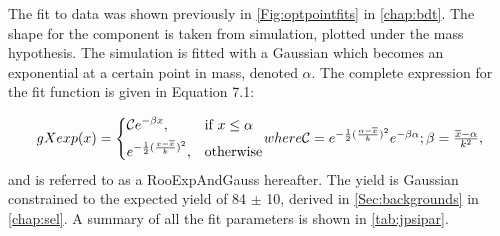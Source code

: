 


The fit to \Lbpijpsi data was shown previously in \autoref{Fig:optpointfits} in \autoref{chap:bdt}. The shape for the \LbKjpsi component is taken from \LbKjpsi simulation, plotted under the \Lbpijpsi mass hypothesis. The \LbKjpsi simulation is fitted with a Gaussian which becomes an exponential at a certain point in mass, denoted $\alpha$. The complete expression for the fit function is given in Equation 7.1:

\begin{equation}
  \label{Eq:gexp2}
  gXexp(x)=
  \begin{dcases}
   \mathcal{C} e^{-\beta x},& \text{if } x\leq \alpha\\
    e^{-\frac{1}{2}(\frac{x-\overline{x}}{k})^{2}}, & \text{otherwise}
  \end{dcases}
  $$where$$
  \mathcal{C} = e^{-\frac{1}{2}(\frac{\alpha-\overline{x}}{k})^{2}}e^{-\beta \alpha};  \beta = \frac{\overline{x} - \alpha}{k^{2}},
  \end{equation}
and is referred to as a RooExpAndGauss hereafter.
The \LbKjpsi yield is Gaussian constrained to the expected yield of 84 $\pm$ 10, derived in \autoref{Sec:backgrounds} in \autoref{chap:sel}. A summary of all the \Lbpijpsi fit parameters is shown in \autoref{tab:jpsipar}.





